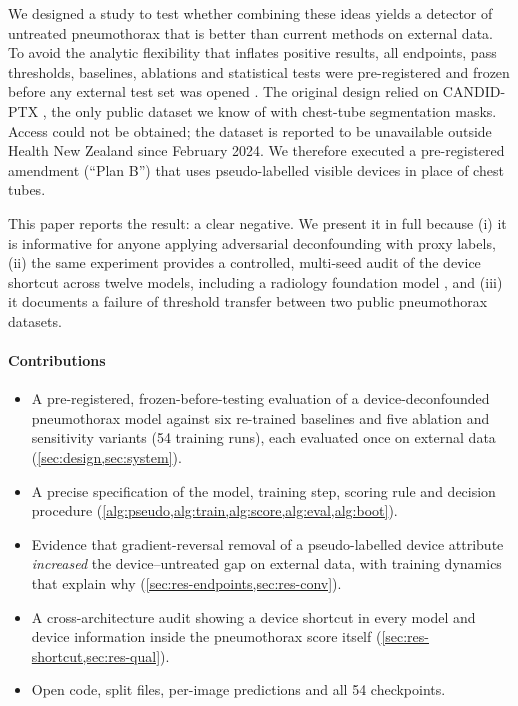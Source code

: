 \documentclass[final,3p]{elsarticle}
\begin{document}
We designed a study to test whether combining these ideas yields a detector of untreated pneumothorax that is better than current methods on external data. To avoid the analytic flexibility that inflates positive results, all endpoints, pass thresholds, baselines, ablations and statistical tests were pre-registered and frozen before any external test set was opened \citep{nosek2018prereg}. The original design relied on CANDID-PTX \citep{feng2021candid}, the only public dataset we know of with chest-tube segmentation masks. Access could not be obtained; the dataset is reported to be unavailable outside Health New Zealand since February 2024. We therefore executed a pre-registered amendment (``Plan B'') that uses pseudo-labelled visible devices in place of chest tubes.

This paper reports the result: a clear negative. We present it in full because (i) it is informative for anyone applying adversarial deconfounding with proxy labels, (ii) the same experiment provides a controlled, multi-seed audit of the device shortcut across twelve models, including a radiology foundation model \citep{perezgarcia2025raddino}, and (iii) it documents a failure of threshold transfer between two public pneumothorax datasets.

\paragraph{Contributions}
\begin{itemize}
  \item A pre-registered, frozen-before-testing evaluation of a device-deconfounded pneumothorax model against six re-trained baselines and five ablation and sensitivity variants (54 training runs), each evaluated once on external data (\cref{sec:design,sec:system}).
  \item A precise specification of the model, training step, scoring rule and decision procedure (\cref{alg:pseudo,alg:train,alg:score,alg:eval,alg:boot}).
  \item Evidence that gradient-reversal removal of a pseudo-labelled device attribute \emph{increased} the device--untreated gap on external data, with training dynamics that explain why (\cref{sec:res-endpoints,sec:res-conv}).
  \item A cross-architecture audit showing a device shortcut in every model and device information inside the pneumothorax score itself (\cref{sec:res-shortcut,sec:res-qual}).
  \item Open code, split files, per-image predictions and all 54 checkpoints.
\end{itemize}
\end{document}
